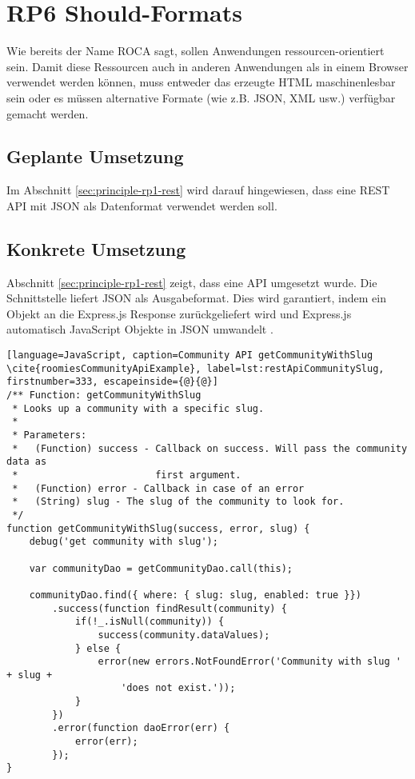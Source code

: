 \section{RP6 Should-Formats}
\label{sec:principle-rp6-should-formats}
Wie bereits der Name ROCA sagt, sollen Anwendungen ressourcen-orientiert sein. Damit diese Ressourcen auch in anderen Anwendungen als in einem Browser verwendet werden können, muss entweder das erzeugte HTML maschinenlesbar sein oder es müssen alternative Formate (wie z.B. JSON, XML usw.) verfügbar gemacht werden.

\subsection*{Geplante Umsetzung}
Im Abschnitt \ref{sec:principle-rp1-rest}  wird darauf hingewiesen, dass eine REST API mit JSON als Datenformat verwendet werden soll.

\subsection*{Konkrete Umsetzung}
Abschnitt \ref{sec:principle-rp1-rest}  zeigt, dass eine API umgesetzt wurde.
Die Schnittstelle liefert JSON als Ausgabeformat. Dies wird garantiert, indem ein Objekt an die Express.js Response \cite{ExpressjsResSend} zurückgeliefert wird und Express.js automatisch JavaScript Objekte in JSON umwandelt \cite{ExpressjsResponseJsonConverter}.

\begin{lstlisting}[language=JavaScript, caption=Community API getCommunityWithSlug \cite{roomiesCommunityApiExample}, label=lst:restApiCommunitySlug, firstnumber=333, escapeinside={@}{@}]
/** Function: getCommunityWithSlug
 * Looks up a community with a specific slug.
 *
 * Parameters:
 *   (Function) success - Callback on success. Will pass the community data as
 *                        first argument.
 *   (Function) error - Callback in case of an error
 *   (String) slug - The slug of the community to look for.
 */
function getCommunityWithSlug(success, error, slug) {
	debug('get community with slug');

	var communityDao = getCommunityDao.call(this);

	communityDao.find({ where: { slug: slug, enabled: true }})
		.success(function findResult(community) {
			if(!_.isNull(community)) {
				success(community.dataValues);
			} else {
				error(new errors.NotFoundError('Community with slug ' + slug +
					'does not exist.'));
			}
		})
		.error(function daoError(err) {
			error(err);
		});
}
\end{lstlisting}

